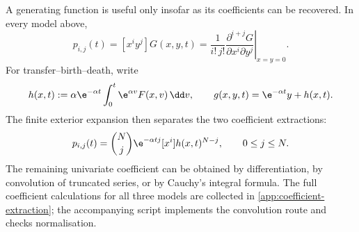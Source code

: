 A generating function is useful only insofar as its coefficients can be recovered.
In every model above,
\begin{equation}
  p_{i,j}(t)=[x^iy^j]G(x,y,t)
  =\frac{1}{i!\,j!}
   \left.
   \frac{\partial^{i+j}G}
        {\partial x^i\partial y^j}
   \right|_{x=y=0}.
  \label{eq:bivariate-coefficient}
\end{equation}
For transfer--birth--death, write
\begin{equation}
  h(x,t)
  :=\alpha\e^{-\alpha t}
     \int_0^t\e^{\alpha v}F(x,v)\,\dd v,
  \qquad
  g(x,y,t)=\e^{-\alpha t}y+h(x,t).
  \label{eq:abd-h-definition}
\end{equation}
The finite exterior expansion then separates the two coefficient extractions:
\begin{equation}
  p_{i,j}(t)
  =\binom Nj\e^{-\alpha tj}
   [x^i]h(x,t)^{N-j},
  \qquad 0\leq j\leq N.
  \label{eq:abd-coefficient-formula}
\end{equation}
The remaining univariate coefficient can be obtained by differentiation, by
convolution of truncated series, or by Cauchy's integral formula.  The full
coefficient calculations for all three models are collected in
\cref{app:coefficient-extraction}; the accompanying script implements the
convolution route and checks normalisation.

\FloatBarrier
